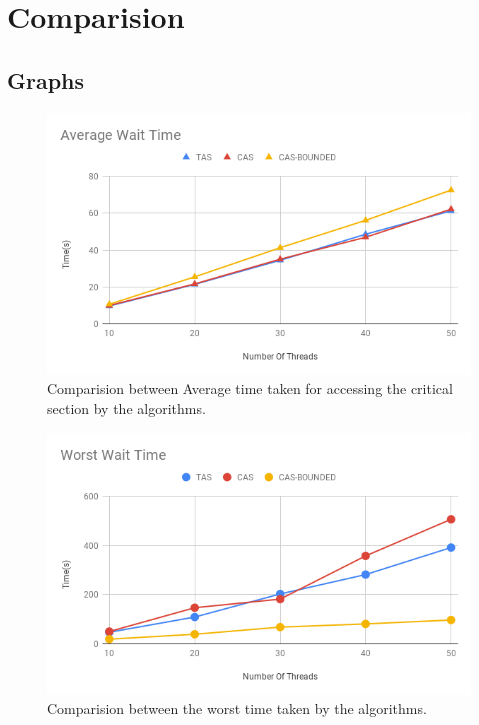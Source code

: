 \documentclass[12pt]{article}
\begin{document}
\section{Comparision}
\subsection{Graphs}
\begin{figure}[ht!]
\includegraphics[width=150mm]{Average_Wait_Time.png}
\caption{Comparision between Average time taken for accessing the critical section by the algorithms.}
\end{figure}
\begin{figure}[ht!]
\includegraphics[width=150mm]{Worst_Wait_Time.png}
\caption{Comparision between the worst time taken by the algorithms.}
\end{figure}

\pagebreak
\end{document}
